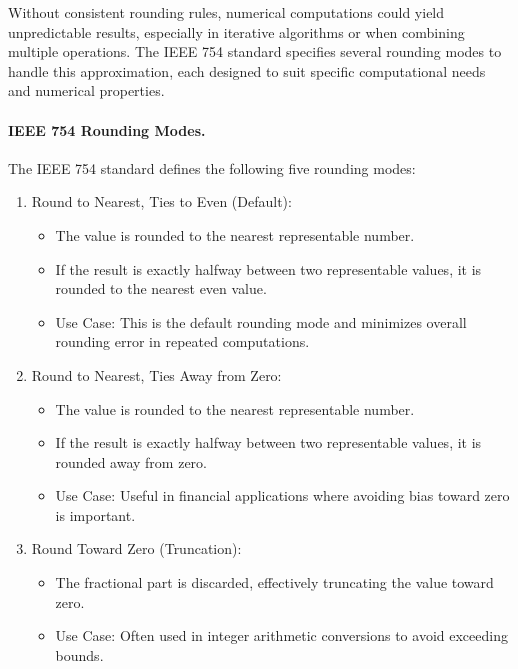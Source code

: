 Without consistent rounding rules, numerical computations could yield unpredictable results, especially in iterative algorithms or when combining multiple operations. The IEEE 754 standard specifies several rounding modes to handle this approximation, each designed to suit specific computational needs and numerical properties.

\paragraph{IEEE 754 Rounding Modes.}
The IEEE 754 standard defines the following five rounding modes:

\begin{enumerate}
    \item Round to Nearest, Ties to Even (Default):
    \begin{itemize}
        \item The value is rounded to the nearest representable number.
        \item If the result is exactly halfway between two representable values, it is rounded to the nearest even value.
        \item Use Case: This is the default rounding mode and minimizes overall rounding error in repeated computations.
    \end{itemize}
    
    \item Round to Nearest, Ties Away from Zero:
    \begin{itemize}
        \item The value is rounded to the nearest representable number.
        \item If the result is exactly halfway between two representable values, it is rounded away from zero.
        \item Use Case: Useful in financial applications where avoiding bias toward zero is important.
    \end{itemize}
    
    \item Round Toward Zero (Truncation):
    \begin{itemize}
        \item The fractional part is discarded, effectively truncating the value toward zero.
        \item Use Case: Often used in integer arithmetic conversions to avoid exceeding bounds.
    \end{itemize}
    

\end{enumerate}
